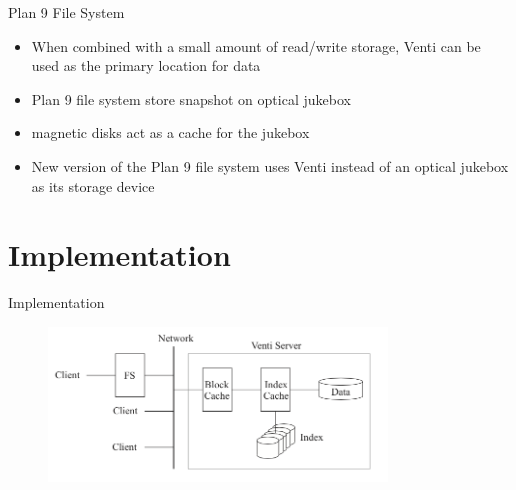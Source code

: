 \begin{frame}{Plan 9 File System}

\begin{itemize}
\itemsep1pt\parskip0pt
\item
  When combined with a small amount of read/write storage, Venti can be
  used as the primary location for data
\item
  Plan 9 file system store snapshot on optical jukebox
\item
  magnetic disks act as a cache for the jukebox
\item
  New version of the Plan 9 file system uses Venti instead of an optical
  jukebox as its storage device
\end{itemize}

\end{frame}

\section[Implement]{Implementation}\label{implementation}

\begin{frame}{Implementation}

\begin{figure}
\includegraphics[width = 9cm]{pic3.png}
\end{figure}

\end{frame}


